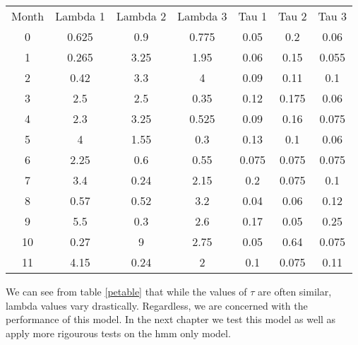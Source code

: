 \begin{center}
    \begin{tabular}{c c c c c c c}
        \label{petable}
        Month	&   Lambda 1	&   Lambda 2	&   Lambda 3	&   Tau 1 	&   Tau 2	&   Tau 3   \\
            0	&   0.625	    &   0.9	        &   0.775	    &   0.05	&   0.2	    &   0.06    \\
            1	&   0.265	    &   3.25	    &   1.95	    &   0.06	&   0.15	&   0.055   \\
            2	&   0.42	    &   3.3	        &   4	        &   0.09	&   0.11	&   0.1     \\
            3	&   2.5	        &   2.5	        &   0.35	    &   0.12	&   0.175	&   0.06    \\
            4	&   2.3	        &   3.25	    &   0.525	    &   0.09	&   0.16	&   0.075   \\
            5	&   4	        &   1.55	    &   0.3	        &   0.13	&   0.1	    &   0.06    \\
            6	&   2.25	    &   0.6	        &   0.55	    &   0.075	&   0.075	&   0.075   \\
            7	&   3.4	        &   0.24	    &   2.15	    &   0.2	    &   0.075	&   0.1     \\
            8	&   0.57	    &   0.52	    &   3.2	        &   0.04	&   0.06	&   0.12    \\
            9	&   5.5	        &   0.3	        &   2.6	        &   0.17	&   0.05	&   0.25    \\
            10	&   0.27	    &   9	        &   2.75	    &   0.05	&   0.64	&   0.075   \\
            11	&   4.15	    &   0.24	    &   2	        &   0.1	    &   0.075	&   0.11    

    \end{tabular}
\end{center}

We can see from table \ref{petable} that while the values of $\tau$ are often similar, lambda values vary drastically. Regardless, we are concerned with the performance of this model. In the next chapter we test this model as well as apply more rigourous tests on the hmm only model.